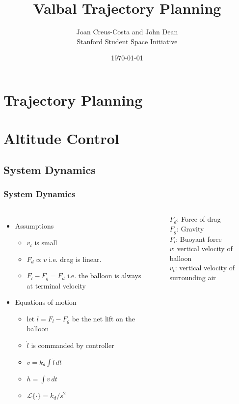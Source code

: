 \documentclass[10pt,mathserif]{beamer}
\title{\large \bfseries Valbal Trajectory Planning}
\author{Joan Creus-Costa and John Dean\\[3ex]
\small Stanford Student Space Initiative}
\date{\today}
\begin{document}
\frame{
\thispagestyle{empty}
\titlepage
}


\section{Trajectory Planning}



\section{Altitude Control}
\subsection{System Dynamics}

\begin{frame}
\frametitle{System Dynamics}
\begin{columns}
\begin{itemize}\itemsep=12pt
\item Assumptions
\vspace*{0.5em}
\begin{itemize}
\item $v_t$ is small
\item $F_d \propto v$ i.e. drag is linear.
\item $F_l - F_g = F_d$ i.e. the balloon is always at terminal velocity 
\end{itemize}
\item Equations of motion
\vspace*{0.5em}
\begin{itemize}
\item let $l = F_l - F_g$ be the net lift on the balloon
\item $\dot l$ is commanded by controller
\item $v = k_{d} \int \dot l \, dt $
\item $h = \int v \, dt$
\item $\mathcal{L}\{\cdot\} = k_{d} / s^2$
\end{itemize}
\end{itemize}


\begin{center}
\end{center}

$F_d$: Force of drag\\
$F_g$: Gravity\\
$F_l$: Buoyant force\\
$v$: vertical velocity of balloon\\
$v_t$: vertical velocity of surrounding air
\end{columns}
\end{frame}
\end{document}
